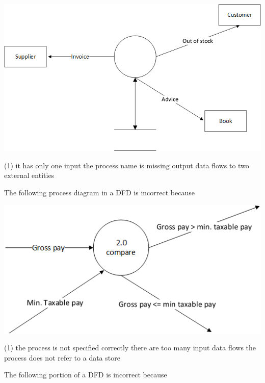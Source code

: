 \documentclass{article}
\begin{document}
\begin{questions}
\begin{exercise}
        \includegraphics{Q3.png}
        \begin{choice}(1)
            \choice it has only one input
            \choice {}
            \choice the process name is missing
            \choice output data flows to two external entities
        \end{choice}
    \end{exercise}
    \begin{exercise}
        The following process diagram in a DFD is incorrect because

        \includegraphics{Q4.png}
        \begin{choice}(1)
            \choice {}
            \choice the process is not specified correctly
            \choice there are too many input data flows
            \choice the process does not refer to a data store
        \end{choice}

    \end{exercise}
    \begin{exercise}
        The following portion of a DFD is incorrect because


\end{exercise}
\end{questions}
\end{document}
